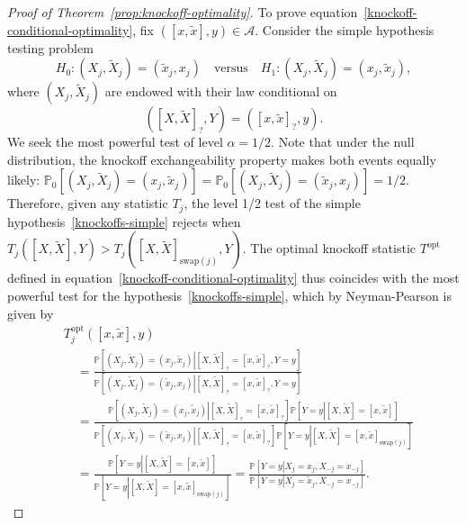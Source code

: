 \documentclass[12pt]{article}
\theoremstyle{definition}
\theoremstyle{remark}
\newcommand{\srx}{X}
\newcommand{\sfx}{x}
\newcommand{\srxk}{\widetilde X}
\newcommand{\sfxk}{\widetilde x}
\newcommand{\sry}{Y}
\newcommand{\sfy}{y}
\begin{document}
\begin{proof}[Proof of Theorem~\ref{prop:knockoff-optimality}]
	
	To prove equation~\eqref{knockoff-conditional-optimality}, fix $([\sfx, \sfxk], \sfy) \in \mathcal A$. Consider the simple hypothesis testing problem
	\begin{equation}
	H_0: (\srx_j, \srxk_j) = (\sfxk_j, \sfx_j) \quad \text{versus} \quad H_1: (\srx_j, \srxk_j) = (\sfx_j, \sfxk_j),
	\label{knockoffs-simple}
	\end{equation}
	where $(\srx_j, \srxk_j)$ are endowed with their law conditional on 
	\begin{equation*}
	([\srx, \srxk]_?, \sry) = ([\sfx, \sfxk]_?, \sfy).
	\end{equation*}
	We seek the most powerful test of level $\alpha = 1/2$. Note that under the null distribution, the knockoff exchangeability property makes both events equally likely: $\mathbb P_0[(\srx_j, \srxk_j) = (\sfx_j, \sfxk_j)] = \mathbb P_0[(\srx_j, \srxk_j) = (\sfxk_j, \sfx_j)] = 1/2$. Therefore, given any statistic $T_j$, the level 1/2 test of the simple hypothesis~\eqref{knockoffs-simple} rejects when $T_j([\srx, \srxk], \sry) > T_j([\srx, \srxk]_{\text{swap}(j)}, \sry)$. The optimal knockoff statistic $T^{\text{opt}}$ defined in equation~\eqref{knockoff-conditional-optimality} thus coincides with the most powerful test for the hypothesis~\eqref{knockoffs-simple}, which by Neyman-Pearson is given by
	\begin{equation*}
	\begin{split}
	&T^{\text{opt}}_j([\sfx, \sfxk], \sfy) \\
	&\quad= \frac{\mathbb P\left[\left.(\srx_j, \srxk_j) = (\sfx_j, \sfxk_j)\right|[\srx, \srxk]_? = [\sfx, \sfxk]_?, \sry = \sfy\right]}{\mathbb P\left[\left.(\srx_j, \srxk_j) = (\sfxk_j, \sfx_j)\right|[\srx, \srxk]_? = [\sfx, \sfxk]_?, \sry = \sfy\right]} \\
	&\quad= \frac{\mathbb P\left[\left.(\srx_j, \srxk_j) = (\sfx_j, \sfxk_j)\right| [\srx, \srxk]_? = [\sfx, \sfxk]_?\right]\mathbb P\left[\sry = \sfy\left|[\srx, \srxk] = [\sfx,\sfxk]\right.\right]}{\mathbb P\left[\left.(\srx_j, \srxk_j) = (\sfxk_j, \sfx_j)\right| [\srx, \srxk]_? = [\sfx, \sfxk]_?\right]\mathbb P\left[\sry = \sfy\left|[\srx, \srxk] = [\sfx,\sfxk]_{\text{swap}(j)}\right.\right]} \\
	&\quad= \frac{\mathbb P\left[\sry = \sfy\left|[\srx, \srxk] = [\sfx,\sfxk]\right.\right]}{\mathbb P\left[\sry = \sfy\left|[\srx, \srxk] = [\sfx,\sfxk]_{\text{swap}(j)}\right.\right]} = \frac{\mathbb P\left[\sry = \sfy\left|\srx_j = \sfx_j, \srx_{-j} = \sfx_{-j}\right.\right]}{\mathbb P\left[\sry = \sfy\left|\srx_j = \sfxk_j, \srx_{-j} = \sfx_{-j}\right.\right]}.

\end{split}
\end{equation*}
\end{proof}
\end{document}
